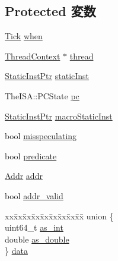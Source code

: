 \subsection*{Protected 変数}
\begin{DoxyCompactItemize}
\item 
\hyperlink{base_2types_8hh_a5c8ed81b7d238c9083e1037ba6d61643}{Tick} \hyperlink{classTrace_1_1InstRecord_a4205d107172cd4b1d39ec6103ee0af75}{when}
\item 
\hyperlink{classThreadContext}{ThreadContext} $\ast$ \hyperlink{classTrace_1_1InstRecord_a8042f727312ecdee2058de43eafc6a74}{thread}
\item 
\hyperlink{classRefCountingPtr}{StaticInstPtr} \hyperlink{classTrace_1_1InstRecord_a6799d48af805bf0bd72441e882589a6a}{staticInst}
\item 
TheISA::PCState \hyperlink{classTrace_1_1InstRecord_ad3585c83b0eac985107aa5a86e43e1b4}{pc}
\item 
\hyperlink{classRefCountingPtr}{StaticInstPtr} \hyperlink{classTrace_1_1InstRecord_a1c5aa7eea381dd38fd1ce49766f213a8}{macroStaticInst}
\item 
bool \hyperlink{classTrace_1_1InstRecord_a9757d6d98faa3585a53837b3b34c7588}{misspeculating}
\item 
bool \hyperlink{classTrace_1_1InstRecord_afbb4c93008d44e809c143bbe5021d16e}{predicate}
\item 
\hyperlink{base_2types_8hh_af1bb03d6a4ee096394a6749f0a169232}{Addr} \hyperlink{classTrace_1_1InstRecord_a0bb77b4ba61e408313e1118250f9278c}{addr}
\item 
bool \hyperlink{classTrace_1_1InstRecord_ab86e97ee280bd6c3c43b927e43c24ff5}{addr\_\-valid}
\item 
\begin{tabbing}
xx\=xx\=xx\=xx\=xx\=xx\=xx\=xx\=xx\=\kill
union \{\\
\>uint64\_t \hyperlink{classTrace_1_1InstRecord_ae36d862eef794b828afe34fa03a9f2f4}{as\_int}\\
\>double \hyperlink{classTrace_1_1InstRecord_ab2cd60e83ec44e797cd2063a6b0b0316}{as\_double}\\
\} \hyperlink{classTrace_1_1InstRecord_a62901a80cf0bb07738c952662ab84dac}{data}\\


\end{tabbing}
\end{DoxyCompactItemize}
